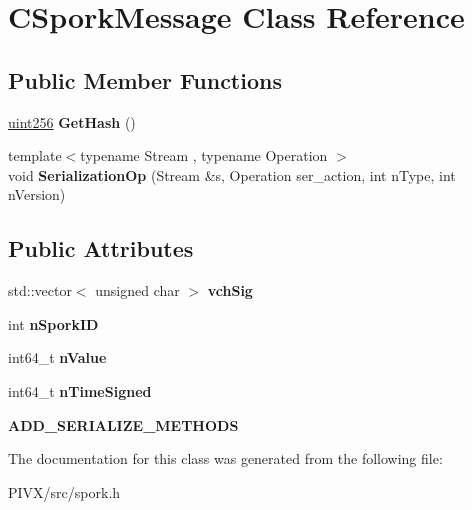 \hypertarget{class_c_spork_message}{}\section{C\+Spork\+Message Class Reference}
\label{class_c_spork_message}
\subsection*{Public Member Functions}
\begin{DoxyCompactItemize}
\item 
\mbox{\label{class_c_spork_message_aa71d5976465a8edb3f11901b14b9df65}} 
\mbox{\hyperlink{classuint256}{uint256}} {\bfseries Get\+Hash} ()
\item 
\mbox{\label{class_c_spork_message_a9c8cdb184cb0f7ddcf490eb9efe147ec}} 
{\footnotesize template$<$typename Stream , typename Operation $>$ }\\void {\bfseries Serialization\+Op} (Stream \&s, Operation ser\+\_\+action, int n\+Type, int n\+Version)
\end{DoxyCompactItemize}
\subsection*{Public Attributes}
\begin{DoxyCompactItemize}
\item 
\mbox{\label{class_c_spork_message_a23740331f22a1ed4a8af5a299a618cc1}} 
std\+::vector$<$ unsigned char $>$ {\bfseries vch\+Sig}
\item 
\mbox{\label{class_c_spork_message_a081216533339aed53adbb0dad2a78f73}} 
int {\bfseries n\+Spork\+ID}
\item 
\mbox{\label{class_c_spork_message_ae15a1fa999993177b2549c4316c89643}} 
int64\+\_\+t {\bfseries n\+Value}
\item 
\mbox{\label{class_c_spork_message_a66a80692ffda8526efa272bb2847030b}} 
int64\+\_\+t {\bfseries n\+Time\+Signed}
\item 
\mbox{\label{class_c_spork_message_afcbd5a0f8bdeebe3794088bf29136071}} 
{\bfseries A\+D\+D\+\_\+\+S\+E\+R\+I\+A\+L\+I\+Z\+E\+\_\+\+M\+E\+T\+H\+O\+DS}
\end{DoxyCompactItemize}


The documentation for this class was generated from the following file\+:\begin{DoxyCompactItemize}
\item 
P\+I\+V\+X/src/spork.\+h\end{DoxyCompactItemize}
